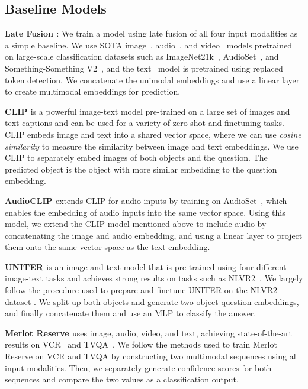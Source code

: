 \documentclass[runningheads]{llncs}
\begin{document}
\subsection{Baseline Models} \label{sec:models}


\textbf{Late Fusion \cite{pandeya2021fusion}}: We train a model using late fusion of all four input modalities as a simple baseline. We use SOTA image~\cite{dosovitskiy2020vit}, audio~\cite{gong2021ast}, and video~\cite{wang2021tdn} models pretrained on large-scale classification datasets such as ImageNet21k~\cite{ridnik2021imagenet21k}, AudioSet~\cite{gemmeke2017audioset}, and Something-Something V2~\cite{goyal2017something}, and the text~\cite{he2021debertav3} model is pretrained using replaced token detection. We concatenate the unimodal embeddings and use a linear layer to create multimodal embeddings for prediction. 

\noindent \textbf{CLIP \cite{radford2021clip}} is a powerful image-text model pre-trained on a large set of images and text captions and can be used for a variety of zero-shot and finetuning tasks. CLIP embeds image and text into a shared vector space, where we can use \textit{cosine similarity} to measure the similarity between image and text embeddings.
We use CLIP to separately embed images of both objects and the question. The predicted object is the object with more similar embedding to the question embedding.

\noindent \textbf{AudioCLIP \cite{guzhov2021audioclip}} extends CLIP for audio inputs by training on AudioSet~\cite{gemmeke2017audioset}, which enables the embedding of audio inputs into the same vector space. Using this model, we extend the CLIP model mentioned above to include audio by concatenating the image and audio embedding, and using a linear layer to project them onto the same vector space as the text embedding. 


\noindent \textbf{UNITER \cite{chen2020uniter}} is an image and text model that is pre-trained using four different image-text tasks and achieves strong results on tasks such as NLVR2~\cite{suhr2019nlvr2}. We largely follow the procedure used to prepare and finetune UNITER on the NLVR2 dataset \cite{suhr2019nlvr2}. We split up both objects and generate two object-question embeddings, and finally concatenate them and use an MLP to classify the answer.


\noindent \textbf{Merlot Reserve \cite{zellers2022merlotreserve}} uses image, audio, video, and text, achieving state-of-the-art results on VCR~\cite{zellers2019vcr} and TVQA~\cite{lei2018tvqa}. We follow the methods used to train Merlot Reserve on VCR and TVQA by constructing two multimodal sequences using all input modalities. Then, we separately generate confidence scores for both sequences and compare the two values as a classification output. 
\end{document}

